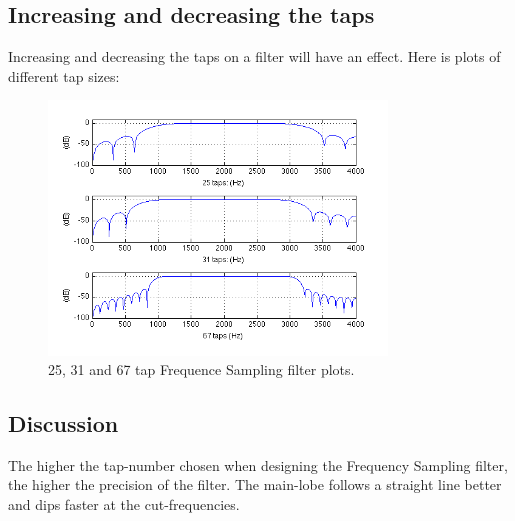 \documentclass[a4wide,10pt]{article}
\begin{document}
		\subsection{Increasing and decreasing the taps} %
		\label{sub:increasing_and_decreasing_the_taps}
		Increasing and decreasing the taps on a filter will have an effect. Here is plots of different tap sizes:
		\begin{figure}[h]
			\centering
				\includegraphics[width=9cm]{images/opgave_3_b.png}
			\caption{25, 31 and 67 tap Frequence Sampling filter plots.}
			\label{fig:images_opgave_3_b}
		\end{figure}
		\subsection{Discussion} %
		\label{sub:discussion}
			The higher the tap-number chosen when designing the Frequency Sampling filter, the higher the precision of the filter. The main-lobe follows a straight line better and dips faster at the cut-frequencies.
	
\newpage
\end{document}
